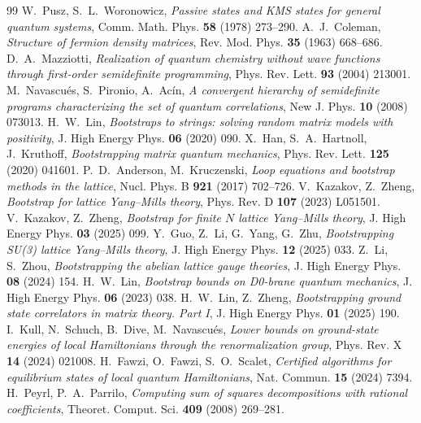 \documentclass[11pt]{article}
\theoremstyle{definition}
\theoremstyle{remark}
\begin{document}
\begin{thebibliography}{99}
 W.~Pusz, S.~L.~Woronowicz, \emph{Passive states and KMS
states for general quantum systems}, Comm. Math. Phys. \textbf{58}
(1978) 273--290.
 A.~J.~Coleman, \emph{Structure of fermion density
matrices}, Rev. Mod. Phys. \textbf{35} (1963) 668--686.
 D.~A.~Mazziotti, \emph{Realization of quantum
chemistry without wave functions through first-order semidefinite
programming}, Phys. Rev. Lett. \textbf{93} (2004) 213001.
 M.~Navascu\'es, S.~Pironio, A.~Ac\'in, \emph{A convergent
hierarchy of semidefinite programs characterizing the set of quantum
correlations}, New J. Phys. \textbf{10} (2008) 073013.
 H.~W.~Lin, \emph{Bootstraps to strings: solving random
matrix models with positivity}, J. High Energy Phys. \textbf{06} (2020)
090.
 X.~Han, S.~A.~Hartnoll, J.~Kruthoff, \emph{Bootstrapping
matrix quantum mechanics}, Phys. Rev. Lett. \textbf{125} (2020) 041601.
 P.~D.~Anderson, M.~Kruczenski, \emph{Loop
equations and bootstrap methods in the lattice}, Nucl. Phys. B
\textbf{921} (2017) 702--726.
 V.~Kazakov, Z.~Zheng, \emph{Bootstrap for lattice
Yang--Mills theory}, Phys. Rev. D \textbf{107} (2023) L051501.
 V.~Kazakov, Z.~Zheng, \emph{Bootstrap for
finite $N$ lattice Yang--Mills theory}, J. High Energy Phys.
\textbf{03} (2025) 099.
 Y.~Guo, Z.~Li, G.~Yang, G.~Zhu, \emph{Bootstrapping
SU(3) lattice Yang--Mills theory}, J. High Energy Phys. \textbf{12}
(2025) 033.
 Z.~Li, S.~Zhou, \emph{Bootstrapping the abelian
lattice gauge theories}, J. High Energy Phys. \textbf{08} (2024) 154.
 H.~W.~Lin, \emph{Bootstrap bounds on D0-brane
quantum mechanics}, J. High Energy Phys. \textbf{06} (2023) 038.
 H.~W.~Lin, Z.~Zheng, \emph{Bootstrapping
ground state correlators in matrix theory.  Part I}, J. High Energy
Phys. \textbf{01} (2025) 190.
 I.~Kull, N.~Schuch, B.~Dive, M.~Navascu\'es,
\emph{Lower bounds on ground-state energies of local Hamiltonians
through the renormalization group}, Phys. Rev. X \textbf{14} (2024)
021008.
 H.~Fawzi, O.~Fawzi, S.~O.~Scalet, \emph{Certified
algorithms for equilibrium states of local quantum Hamiltonians}, Nat.
Commun. \textbf{15} (2024) 7394.
 H.~Peyrl, P.~A.~Parrilo, \emph{Computing sum of
squares decompositions with rational coefficients}, Theoret. Comput.
Sci. \textbf{409} (2008) 269--281.

\end{thebibliography}
\end{document}
